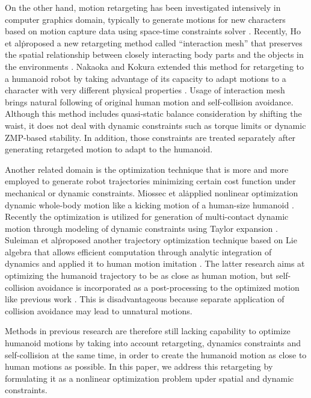 \documentclass[letterpaper, 10 pt, conference]{ieeeconf}  %
\begin{document}
On the other hand, motion retargeting has been investigated
intensively in computer graphics domain, typically to generate motions
for new characters based on motion capture data using space-time
constraints solver \cite{Gleicher98}.  Recently, Ho et al\. proposed a
new retargeting method called ``interaction mesh'' that preserves the
spatial relationship between closely interacting body parts and the
objects in the environments \cite{Komura10}.  Nakaoka and Kokura
extended this method for retargeting to a humanoid robot by taking
advantage of its capacity to adapt motions to a character with very
different physical properties \cite{Nakaoka12Humanoids}. Usage of
interaction mesh brings natural following of original human motion and
self-collision avoidance.  Although this method includes quasi-static
balance consideration by shifting the waist, it does not deal with
dynamic constraints such as torque limits or dynamic ZMP-based
stability. In addition, those constraints are treated separately after
generating retargeted motion to adapt to the humanoid.


Another related domain is the optimization technique that is more and
more employed to generate robot trajectories minimizing certain cost
function under mechanical or dynamic constraints. Miossec et
al\. applied nonlinear optimization dynamic whole-body motion like a
kicking motion of a human-size humanoid \cite{Miossec06ROBIO}.
Recently the optimization is utilized for generation of multi-contact
dynamic motion through modeling of dynamic constraints using Taylor
expansion \cite{Lengagne13IJRR}. Suleiman et al\. proposed another
trajectory optimization technique based on Lie algebra that allows
efficient computation through analytic integration of dynamics
\cite{Suleiman07Humanoids} and applied it to human motion imitation
\cite{Suleiman08ICRA}.  The latter research aims at optimizing the
humanoid trajectory to be as close as human motion, but self-collision
avoidance is incorporated as a post-processing to the optimized motion
like previous work \cite{Nakaoka12Humanoids}. This is disadvantageous
because separate application of collision avoidance may lead to
unnatural motions.


Methods in previous research are therefore still lacking capability to
optimize humanoid motions by taking into account retargeting, dynamics
constraints and self-collision at the same time, in order to create
the humanoid motion as close to human motions as possible. In this
paper, we address this retargeting by formulating it as a nonlinear
optimization problem upder spatial and dynamic constraints.
\end{document}
